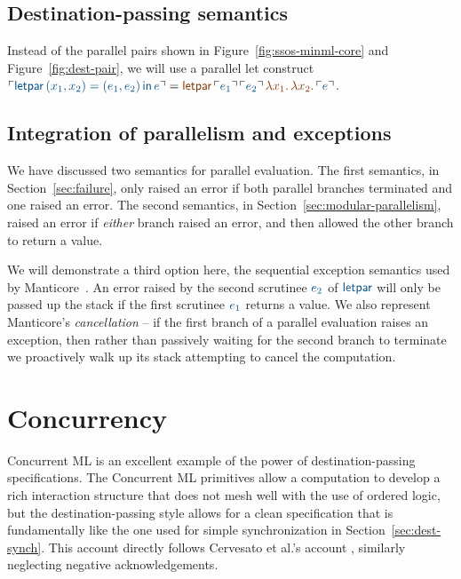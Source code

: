 \subsection{Destination-passing semantics}

Instead of the parallel pairs shown in
Figure~\ref{fig:ssos-minml-core} and Figure~\ref{fig:dest-pair}, we
will use a parallel let construct $\interp{{\sf letpar}\, (x_1,x_2) =
  (e_1,e_2) \,{\sf in}\,e} = \lf{{\sf
    letpar}\,\interp{e_1}\,\interp{e_2}\,\lambda x_1.\,\lambda
  x_2.\,\interp{e}}$.

\bigskip
{}

\subsection{Integration of parallelism and exceptions}

We have discussed two semantics for parallel evaluation. The first
semantics, in Section~\ref{sec:failure}, only raised an error if both
parallel branches terminated and one raised an error. The second
semantics, in Section~\ref{sec:modular-parallelism}, raised an error
if {\it either} branch raised an error, and then allowed the other
branch to return a value.

We will demonstrate a third option here, the sequential exception
semantics used by Manticore~\cite{fluet08scheduling}. An error raised
by the second scrutinee $\obj{e_2}$ of $\obj{\sf letpar}$ will only be
passed up the stack if the first scrutinee $\obj{e_1}$ returns a
value. We also represent Manticore's {\it cancellation} -- if the
first branch of a parallel evaluation raises an exception, then rather
than passively waiting for the second branch to terminate we
proactively walk up its stack attempting to cancel the computation.

\bigskip
{}


\section{Concurrency}

Concurrent ML is an excellent example of the power of
destination-passing specifications. The Concurrent ML primitives allow
a computation to develop a rich interaction structure that does not
mesh well with the use of ordered logic, but the destination-passing
style allows for a clean specification that is fundamentally like the
one used for simple synchronization in
Section~\ref{sec:dest-synch}. This account directly follows Cervesato
et al.'s account \cite{cervesato02concurrent}, similarly neglecting
negative acknowledgements.

